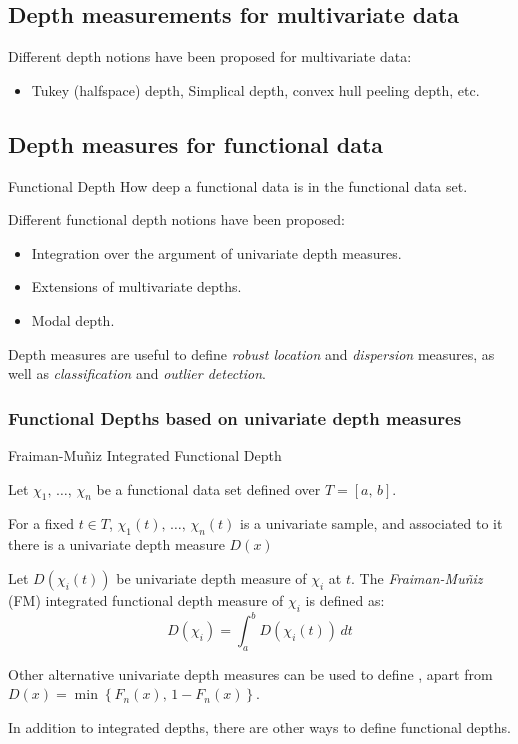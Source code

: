 \subsection{Depth measurements for multivariate data}

Different depth notions have been proposed for multivariate data:
\begin{itemize}
    \item Tukey (halfspace) depth, Simplical depth, convex hull peeling depth, etc.
\end{itemize}

\subsection{Depth measures for functional data}

\begin{definition}{Functional Depth}{}
    How deep a functional data is in the functional data set.

    Different functional depth notions have been proposed:
    \begin{itemize}
        \item Integration over the argument of univariate depth measures.
        \item Extensions of multivariate depths.
        \item Modal depth.
    \end{itemize}
    \tcblower
    Depth measures are useful to define \emph{robust location} and \emph{dispersion} measures,
    as well as \emph{classification} and \emph{outlier detection}.
\end{definition}

\subsubsection{Functional Depths based on univariate depth measures}

\begin{definition}{Fraiman-Muñiz Integrated Functional Depth}{}

Let $\chi_1,\, \dots,\, \chi_n$ be a functional data set defined over
$T = [a,\,b]$.

For a fixed $t \in T$, $\chi_1(t),\, \dots,\, \chi_n(t)$ is a univariate sample,
and associated to it there is a univariate depth measure $D(x)$

Let $D(\chi_i(t))$ be univariate depth measure of $\chi_i$ at $t$.
The \emph{Fraiman-Muñiz} (FM) integrated functional depth measure of
$\chi_i$ is defined as:
\begin{equation*}
    D(\chi_i) = \int_a^b D(\chi_i(t)) \, dt \tag{FM depth}
\end{equation*}
\tcblower
\begin{note}
    Other alternative univariate depth measures can be used to define ,
    apart from $D(x) = \min\left\{ F_n(x),\, 1 - F_n(x) \right\}$.
\end{note}
\begin{note}
    In addition to integrated depths, there are other ways to define functional depths.
\end{note}
\end{definition}

